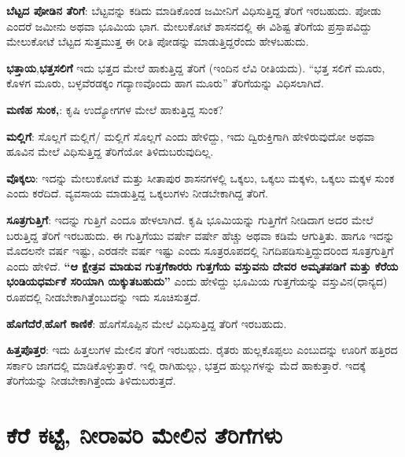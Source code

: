 \textbf{ಬೆಟ್ಟದ ಪೋಡಿನ ತೆರಿಗೆ}: ಬೆಟ್ಟವನ್ನು ಕಡಿದು ಮಾಡಿಕೊಂಡ ಜಮೀನಿಗೆ ವಿಧಿಸುತ್ತಿದ್ದ ತೆರಿಗೆ ಇರಬಹುದು. ಪೋಡು ಎಂದರೆ ಜಮೀನು ಅಥವಾ ಭೂಮಿಯ ಭಾಗ. ಮೇಲುಕೋಟೆ ಶಾಸನದಲ್ಲಿ ಈ ವಿಶಿಷ್ಟ ತೆರಿಗೆಯ ಪ್ರಸ್ತಾಪವಿದ್ದು ಮೇಲುಕೋಟೆ ಬೆಟ್ಟದ ಸುತ್ತಮುತ್ತ ಈ ರೀತಿ ಪೋಡನ್ನು ಮಾಡುತ್ತಿದ್ದರೆಂದು ಹೇಳಬಹುದು.

\textbf{ಭತ್ತಾಯ},\textbf{ಭತ್ತಸಲಿಗೆ} ಇದು ಭತ್ತದ ಮೇಲೆ ಹಾಕುತ್ತಿದ್ದ ತೆರಿಗೆ (ಇಂದಿನ ಲೆವಿ ರೀತಿಯದು). “ಭತ್ತ ಸಲಿಗೆ ಮೂರು, ಕೊಳಗ ಮೂರು, ಬಳ್ಳವೆರಡಕ್ಕಂ ಗದ್ಯಾಣವೊಂದು ಹಾಗ ಮೂರು” ತೆರಿಗೆಯನ್ನು ವಿಧಿಸಲಾಗಿದೆ.

\textbf{ಮಣಿಹ ಸುಂಕ,}: ಕೃಷಿ ಉದ್ಯೋಗಗಳ ಮೇಲೆ ಹಾಕುತ್ತಿದ್ದ ಸುಂಕ?

\textbf{ಮಲ್ಲಿಗೆ}: ಸೊಲ್ಲಗೆ ಮಲ್ಲಿಗೆ/ ಮಲ್ಲಿಗೆ ಸೊಲ್ಲಗೆ ಎಂದು ಹೇಳಿದ್ದು, ಇದು ದ್ವಿರುಕ್ತಿಗಾಗಿ ಹೇಳಿರುವುದೋ ಅಥವಾ ಹೂವಿನ ಮೇಲೆ ವಿಧಿಸುತ್ತಿದ್ದ ತೆರಿಗೆಯೋ ತಿಳಿದುಬರುವುದಿಲ್ಲ.

\textbf{ವೊಕ್ಕಲು}: ಇದನ್ನು ಮೇಲುಕೋಟೆ ಮತ್ತು ಸೀತಾಪುರ ಶಾಸನಗಳಲ್ಲಿ ಒಕ್ಕಲು, ಒಕ್ಕಲು ಮಕ್ಕಳು, ಒಕ್ಕಲು ಮಕ್ಕಳ ಸುಂಕ ಎಂದು ಕರೆದಿದೆ. ವ್ಯವಸಾಯ ಮಾಡುತ್ತಿದ್ದ ಒಕ್ಕಲುಗಳು ನೀಡಬೇಕಾಗಿದ್ದ ತೆರಿಗೆ.

\textbf{ಸೂತ್ರಗುತ್ತಿಗೆ}: ಇದನ್ನು ಗುತ್ತಿಗೆ ಎಂದೂ ಹೇಳಲಾಗಿದೆ. ಕೃಷಿ ಭೂಮಿಯನ್ನು ಗುತ್ತಿಗೆಗೆ ನೀಡಿದಾಗ ಅದರ ಮೇಲೆ ಬರುತ್ತಿದ್ದ ತೆರಿಗೆ ಇರಬಹುದು. ಈ ಗುತ್ತಿಗೆಯು ವರ್ಷೇ ವರ್ಷೇ ಹೆಚ್ಚು ಅಥವಾ ಕಡಿಮೆ ಆಗುತ್ತಿತು. ಹಾಗೂ ಇದನ್ನು ಮೊದಲನೇ ವರ್ಷ ಇಷ್ಟು, ಎರಡನೇ ವರ್ಷ ಇಷ್ಟು ಎಂದು ಸೂತ್ರರೂಪದಲ್ಲಿ ನಿಗದಿಪಡಿಸುತ್ತಿದ್ದುದರಿಂದ ಸೂತ್ರಗುತ್ತಿಗೆ ಎಂದು ಹೇಳಿದೆ.\textbf{ “ಆ ಕ್ಷೇತ್ರವ ಮಾಡುವ ಗುತ್ತಗೆಕಾರರು ಗುತ್ತಗೆಯ ವಸ್ತುವನು ದೇವರ ಅಮೃತಪಡಿಗೆ ಮತ್ತು ಕೆರೆಯ ಭಂಡಿಯಧರ್ಮಕೆ ಸರಿಯಾಗಿ ಯಿಕ್ಕುತಬಹುದು” }ಎಂದು ಹೇಳಿದ್ದು ಭೂಮಿಯ ಗುತ್ತಗೆಯನ್ನು ವಸ್ತುವಿನ(ಧಾನ್ಯದ) ರೂಪದಲ್ಲಿ ನೀಡಬೇಕಾಗಿತ್ತೆಂಬುದನ್ನು ಇದು ಸೂಚಿಸುತ್ತದೆ.

\textbf{ಹೊಗೆದೆರೆ},\textbf{ಹೊಗೆ ಕಾಣಿಕೆ}: ಹೊಗೆಸೊಪ್ಪಿನ ಮೇಲೆ ವಿಧಿಸುತ್ತಿದ್ದ ತೆರಿಗೆ ಇರಬಹುದು.

\textbf{ಹಿತ್ತಪೊತ್ತರ}: ಇದು ಹಿತ್ತಲುಗಳ ಮೇಲಿನ ತೆರಿಗೆ ಇರಬಹುದು. ರೈತರು ಹುಲ್ಲಕೊಪ್ಪಲು ಎಂಬುದನ್ನು ಊರಿಗೆ ಹತ್ತಿರದ ಸರ್ಕಾರಿ ಜಾಗದಲ್ಲಿ ಮಾಡಿಕೊಳ್ಳುತ್ತಾರೆ. ಇಲ್ಲಿ ರಾಗಿಹುಲ್ಲು, ಭತ್ತದ ಹುಲ್ಲುಗಳನ್ನು ಮೆದೆ ಹಾಕುತ್ತಾರೆ. ಇದಕ್ಕೆ ತೆರಿಗೆಯನ್ನು ನೀಡಬೇಕಾಗಿತ್ತೆಂದು ತಿಳಿದುಬರುತ್ತದೆ.


\section{ಕೆರೆ ಕಟ್ಟೆ, ನೀರಾವರಿ ಮೇಲಿನ ತೆರಿಗೆಗಳು}

